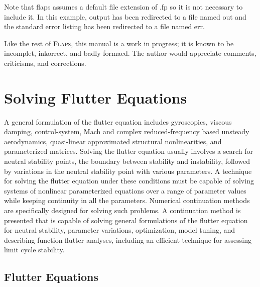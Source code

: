 \documentclass[11pt,openany,twoside]{book}
\numberwithin{equation}{section}		%
\newcommand{\Cmd}[1]{{\sf #1}}
\newcommand{\Flaps}{\textsc{Flaps\:}}
\begin{document}
Note that \Cmd{flaps} assumes a default file extension of \Cmd{.fp}
so it is not necessary to include it.
In this example, output has been redirected to a file named
\Cmd{out} and the standard error listing has been
redirected to a file named \Cmd{err}.
\par
Like the rest of \Flaps, this manual is a work in progress;
it is known to be incomplet, inkorrect, and badly
formaed.
The author would appreciate comments, criticisms, and corrections.

\newpage
\chapter{Solving Flutter Equations}\label{chap:theory}
A general formulation of the flutter equation includes
gyroscopics, 
viscous damping, 
control-system, Mach and complex reduced-frequency
based unsteady aerodynamics, quasi-linear approximated structural
nonlinearities, and parameterized matrices.  Solving the flutter equation
usually involves a search for neutral stability points, the boundary
between stability and instability, followed by variations in the neutral
stability point with various parameters.  A technique for  solving the
flutter equation under these conditions must be capable
of solving systems of nonlinear parameterized equations over a range
of parameter values while keeping continuity in all the parameters.
Numerical continuation methods
\cite{rheinboldt1986numerical,allgower1990numerical}
are specifically designed
for solving such problems.  A continuation method is presented that is
capable of solving general formulations of the flutter equation for
neutral stability, parameter variations, optimization, model tuning,
and describing function flutter analyses, including an efficient technique for
assessing limit cycle stability.

\section{Flutter Equations}\label{sect:flutter-eqns}
\end{document}
